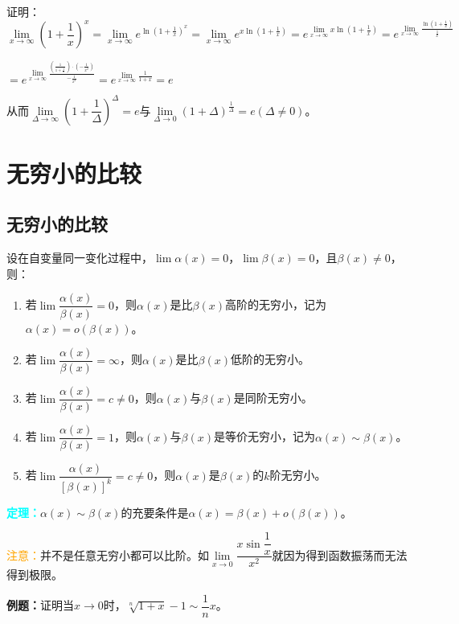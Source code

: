 \documentclass[UTF8, 12pt]{ctexart}
\begin{document}
证明：$\lim\limits_{x\to\infty}\left(1+\dfrac{1}{x}\right)^x=\lim\limits_{x\to\infty}e^{\ln(1+\frac{1}{x})^x}=\lim\limits_{x\to\infty}e^{x\ln(1+\frac{1}{x})}=e^{\lim\limits_{x\to\infty}x\ln(1+\frac{1}{x})}=e^{\lim\limits_{x\to\infty}\frac{\ln(1+\frac{1}{x})}{\frac{1}{x}}}$

$=e^{\lim\limits_{x\to\infty}\frac{\left(\frac{1}{1+\frac{1}{x}}\right)\cdot\left(-\frac{1}{x^2}\right)}{-\frac{1}{x^2}}}=e^{\lim\limits_{x\to\infty}\frac{1}{1+x}}=e$\medskip

从而$\lim\limits_{\Delta\to\infty}\left(1+\dfrac{1}{\Delta}\right)^\Delta=e$与$\lim\limits_{\Delta\to 0}\left(1+\Delta\right)^{\frac{1}{\Delta}}=e(\Delta\neq 0)$。

\section{无穷小的比较}

\subsection{无穷小的比较}

设在自变量同一变化过程中，$\lim\alpha(x)=0$，$\lim\beta(x)=0$，且$\beta(x)\neq 0$，则：

\begin{enumerate}
    \item 若$\lim\dfrac{\alpha(x)}{\beta(x)}=0$，则$\alpha(x)$是比$\beta(x)$高阶的无穷小，记为$\alpha(x)=o(\beta(x))$。
    \item 若$\lim\dfrac{\alpha(x)}{\beta(x)}=\infty$，则$\alpha(x)$是比$\beta(x)$低阶的无穷小。
    \item 若$\lim\dfrac{\alpha(x)}{\beta(x)}=c\neq 0$，则$\alpha(x)$与$\beta(x)$是同阶无穷小。
    \item 若$\lim\dfrac{\alpha(x)}{\beta(x)}=1$，则$\alpha(x)$与$\beta(x)$是等价无穷小，记为$\alpha(x)\sim\beta(x)$。
    \item 若$\lim\dfrac{\alpha(x)}{[\beta(x)]^k}=c\neq 0$，则$\alpha(x)$是$\beta(x)$的$k$阶无穷小。
\end{enumerate}

\textcolor{aqua}{\textbf{定理：}}$\alpha(x)\sim\beta(x)$的充要条件是$\alpha(x)=\beta(x)+o(\beta(x))$。

\textcolor{orange}{注意：}并不是任意无穷小都可以比阶。如$\lim\limits_{x\to 0}\dfrac{x\sin\dfrac{1}{x}}{x^2}$就因为得到函数振荡而无法得到极限。

\textbf{例题：}证明当$x\to 0$时，$\sqrt[n]{1+x}-1\sim\dfrac{1}{n}x$。
\end{document}

